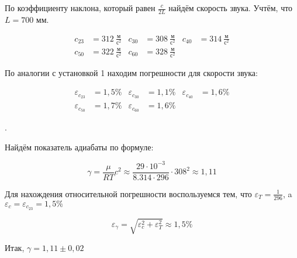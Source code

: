 \documentclass[a4paper, 12pt]{article}
\newcommand{\eps}{\varepsilon}
\newcounter{Points}
\newcommand{\point}{\arabic{Points}. \addtocounter{Points}{1}}
\begin{document}
По коэффициенту наклона, который равен $\displaystyle \frac{c}{2L}$ найдём скорость звука. Учтём, что $L = 700$ мм.

\begin{align*}
    c_{23} &= 312 ~\frac{\text{м}}{\text{с}^2} &
    c_{30} &= 308 ~\frac{\text{м}}{\text{с}^2} &
    c_{40} &= 314 ~\frac{\text{м}}{\text{с}^2} \\
    c_{50} &= 322 ~\frac{\text{м}}{\text{с}^2} &
    c_{60} &= 328 ~\frac{\text{м}}{\text{с}^2}  
\end{align*}

По аналогии с установкой 1 находим погрешности для скорости звука:

\begin{align*}
    \eps_{c_{23}} &= 1,5\% &
    \eps_{c_{30}} &= 1,1\% &
    \eps_{c_{40}} &= 1,6\% \\
    \eps_{c_{50}} &= 1,7\% &
    \eps_{c_{60}} &= 1,6\% 
\end{align*}

\point Найдём показатель адиабаты по формуле:

\[
    \gamma = \frac{\mu}{RT}c^2 \approx \frac{29 \cdot 10^{-3}}{8.314 \cdot 296} \cdot 308^2 \approx 1,11
\]

Для нахождения относительной погрешности воспользуемся тем, что $\displaystyle \eps_{T} = \frac{1}{296}$, a $\eps_c = \eps_{c_{23}} = 1,5\%$

\[
    \eps_\gamma = \sqrt{\eps_c^2 + \eps_T^2} \approx 1,5\%
\]

Итак, $\gamma = 1,11 \pm 0,02$
\end{document}
